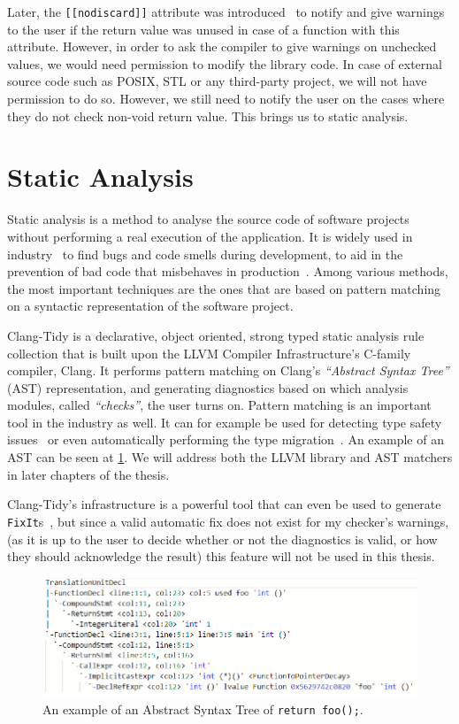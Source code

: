 Later, the \texttt{[[nodiscard]]} attribute was introduced~\cite{cppreferencenodiscard} to notify and give warnings to
the user if the return value was unused in case of a function
with this attribute. However, in order to ask the compiler to give warnings on unchecked values, we would need permission to modify the library code.
In case of external source code such as POSIX, STL or any third-party project, we will not have permission to do so.
However, we still need to notify the user on the cases where they do not check non-void return value. This brings us to static analysis.

\section{Static Analysis}

Static analysis is a method to analyse the source code of software projects without performing a real execution of the application.
It is widely used in industry~\cite{statcompare}
to find bugs and code smells during development, to aid in the prevention of bad code that misbehaves in
production~\cite{googlearticle}.
Among various methods, the most important techniques are the ones that are based on pattern matching on a syntactic representation of
the software project.

Clang-Tidy is a declarative, object oriented, strong typed static analysis rule collection that is built upon the LLVM Compiler
Infrastructure's C-family compiler, Clang.
It performs pattern matching on Clang's \emph{``Abstract Syntax Tree''} (AST) representation, and generating diagnostics based on which
analysis modules, called \emph{``checks''}, the user turns on. Pattern matching is an important tool in the industry as well. It can for
example be used for detecting type safety issues~\cite{SZALAY2021111048} or even automatically performing the type migration~\cite{typemig}. An example of an AST can be seen at \cref{fig:ast1}.
We will address both the LLVM library and AST matchers in later chapters of the thesis.

Clang-Tidy's infrastructure is a powerful tool that can even be used to generate \texttt{FixIt}s~\cite{autorefact}, but since a
valid automatic fix does not exist for my checker's warnings, (as it is up to the user to decide whether or not the diagnostics is
valid, or how they should acknowledge the result) this feature will not be used in this thesis.


\begin{figure}[H]
    \includegraphics[width=\linewidth]{images/return_foo_ast.png}
    \caption{An example of an Abstract Syntax Tree of \texttt{return foo();}.}
    \label{fig:ast1}
\end{figure}

